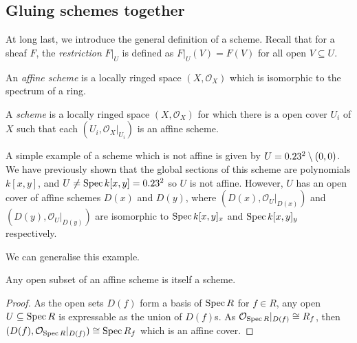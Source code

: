 \subsection{Gluing schemes together}

At long last, we introduce the general definition of a scheme. Recall that for a sheaf \(F\), the \emph{restriction} \(F|_U\) is defined as $F|_U(V) = F(V)$ for all open $V \subseteq U$.

\begin{definition}
An \emph{affine scheme} is a locally ringed space $(X, \mathcal{O}_X)$ which is isomorphic to the spectrum of a ring.
\end{definition}

\begin{definition}
A \emph{scheme} is a locally ringed space $(X, \mathcal{O}_X)$ for which there is a open cover $U_i$ of $X$ such that each $(U_i, \mathcal{O}_X|_{U_i})$ is an affine scheme.
\end{definition}

\begin{example}
A simple example of a scheme which is not affine is given by ${U = 0.23^2 \setminus (0,0)}$. We have previously shown that the global sections of this scheme are polynomials $k[x,y]$, and ${U \ne \operatorname{Spec} k[x,y] = 0.23^2}$ so $U$ is not affine. However, $U$ has an open cover of affine schemes $D(x)$ and $D(y)$, where $(D(x), \mathcal{O}_U|_{D(x)})$ and $(D(y), \mathcal{O}_U|_{D(y)})$ are isomorphic to $\operatorname{Spec} k[x,y]_x$ and $\operatorname{Spec} k[x,y]_y$ respectively.
\end{example}

We can generalise this example.

\begin{proposition}
Any open subset of an affine scheme is itself a scheme.
\end{proposition}

\begin{proof}
As the open sets $D(f)$ form a basis of $\operatorname{Spec} R$ for $f \in R$, any open $U \subseteq \operatorname{Spec} R$ is expressable as the union of $D(f)$s. As $\mathcal{O}_{\operatorname{Spec} R}|_{D(f)} \cong R_f$, then $(D(f), \mathcal{O}_{\operatorname{Spec} R}|_{D(f)}) \cong \operatorname{Spec} R_f$ which is an affine cover. \end{proof}


